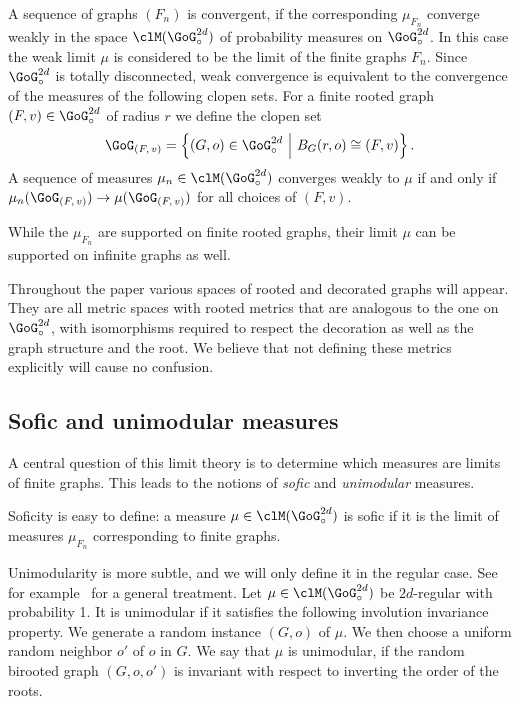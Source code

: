 A sequence of graphs $(F_n)$ is convergent, if the corresponding $\mu_{F_n}$ converge weakly in the space $\clM(\GoG_{\circ}^{2d})$ of probability measures on $\GoG_{\circ}^{2d}$. In this case the weak limit $\mu$ is considered to be the limit of the finite graphs $F_n$. Since $\GoG_{\circ}^{2d}$ is totally disconnected, weak convergence is equivalent to the convergence of the measures of the following clopen sets. For a finite rooted graph $(F,v) \in \GoG_{\circ}^{2d}$ of radius $r$ we define the clopen set
\[
\GoG_{(F,\,v)}=\left\{(G,o) \in \GoG_{\circ}^{2d}~\middle|~B_{G}(r,o) \cong (F,v)\right\}.
\]
A sequence of measures $\mu_n \in \clM(\GoG_{\circ}^{2d})$ converges weakly to $\mu$ if and only if $\mu_n(\GoG_{(F,\,v)})\linebreak\to \mu(\GoG_{(F,\,v)})$ for all choices of $(F,v)$.

While the $\mu_{F_n}$ are supported on finite rooted graphs, their limit $\mu$ can be supported on infinite graphs as well.

Throughout the paper various spaces of rooted and decorated graphs will appear. They are all metric spaces with rooted metrics that are analogous to the one on $\GoG_{\circ}^{2d}$, with isomorphisms required to respect the decoration as well as the graph structure and the root. We believe that not defining these metrics explicitly will cause no confusion.


\subsection{Sofic and unimodular measures}
A central question of this limit theory is to determine which measures are limits of finite graphs. This leads to the notions of \emph{sofic} and \emph{unimodular} measures.

Soficity is easy to define: a measure $\mu \in \clM(\GoG_{\circ}^{2d})$ is sofic if it is the limit of measures $\mu_{F_n}$ corresponding to finite graphs.

Unimodularity is more subtle, and we will only define it in the regular case. See for example~\cite{lovasz2012large} for a general treatment. Let $\mu \in \clM(\GoG_{\circ}^{2d})$ be $2d$-regular with probability 1. It is unimodular if it satisfies the following involution invariance property. We generate a random instance $(G,o)$ of $\mu$. We then choose a uniform random neighbor $o'$ of $o$ in $G$. We say that $\mu$ is unimodular, if the random birooted graph $(G,o,o')$ is invariant with respect to inverting the order of the roots.

